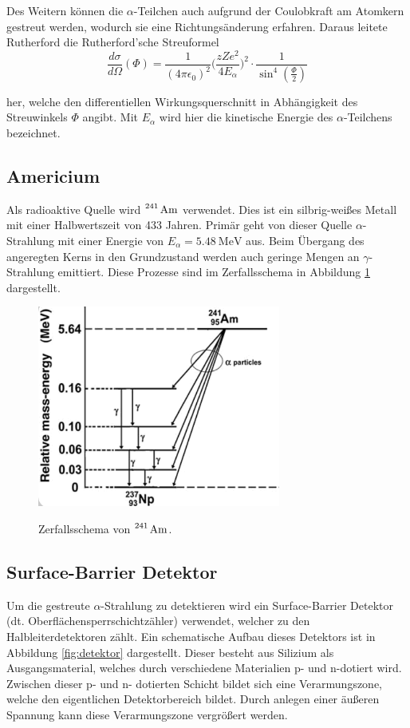 Des Weitern können die $\alpha$-Teilchen auch aufgrund der Coulobkraft am Atomkern gestreut werden, wodurch sie eine
Richtungsänderung erfahren. Daraus leitete Rutherford die Rutherford'sche Streuformel
\begin{equation}
  \frac{d\sigma}{d\Omega}(\Phi)=\frac{1}{(4\pi \epsilon_0)^2}\Bigg(\frac{zZe^2}{4E_{\alpha}}\Bigg)^2
  \cdot\frac{1}{\sin^4{(\frac{\Phi}{2})}}
  \label{eqn:Rutherford}
\end{equation}

her, welche den differentiellen Wirkungsquerschnitt in Abhängigkeit des Streuwinkels $\Phi$ angibt. Mit $E_{\alpha}$
wird hier die kinetische Energie des $\alpha$-Teilchens bezeichnet.

\subsection{Americium}

Als radioaktive Quelle wird $\ce{^{241} Am}$ verwendet. Dies ist ein silbrig-weißes Metall mit einer
Halbwertszeit von 433 Jahren. Primär geht von dieser Quelle $\alpha$-Strahlung mit einer Energie von
$E_{\alpha}=\SI{5,48}{\MeV}$ aus. Beim Übergang des angeregten Kerns in den Grundzustand werden auch geringe
Mengen an $\gamma$-Strahlung emittiert. Diese Prozesse sind im Zerfallsschema in Abbildung \ref{fig:Zerfall}
dargestellt.

\begin{figure}[H]
  \centering
  \includegraphics[width=8cm]{zerfall2.png}
  \caption{Zerfallsschema von $\ce{^{241} Am}$. }
  \label{fig:Zerfall}
  \cite{zerfall}
\end{figure}

\subsection{Surface-Barrier Detektor}
Um die gestreute $\alpha$-Strahlung zu detektieren wird ein Surface-Barrier Detektor
(dt. Oberflächensperrschichtzähler) verwendet, welcher zu den Halbleiterdetektoren zählt.
Ein schematische Aufbau dieses Detektors ist in Abbildung \ref{fig:detektor} dargestellt.
Dieser besteht aus Silizium als Ausgangsmaterial, welches durch verschiedene Materialien
p- und n-dotiert wird. Zwischen dieser p- und n- dotierten Schicht bildet sich eine Verarmungszone,
welche den eigentlichen Detektorbereich bildet. Durch anlegen einer äußeren Spannung kann diese
Verarmungszone vergrößert werden.


